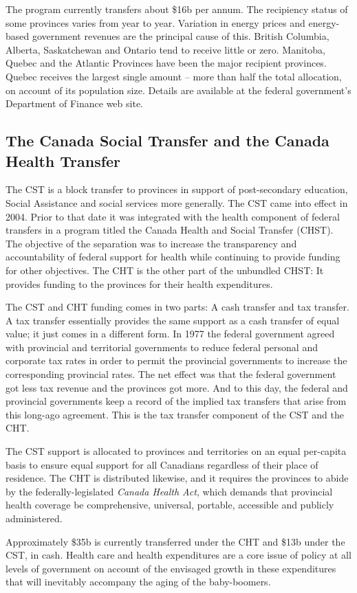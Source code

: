 The program currently transfers about \$16b per annum. The recipiency status
of some provinces varies from year to year. Variation in energy prices and
energy-based government revenues are the principal cause of this. British
Columbia, Alberta, Saskatchewan and Ontario tend to receive little or zero.
Manitoba, Quebec and the Atlantic Provinces have been the major recipient
provinces. Quebec receives the largest single amount -- more than half the
total allocation, on account of its population size. Details are available
at the federal government's Department of Finance web site.

\newhtmlpage

\subsection*{The Canada Social Transfer and the Canada Health Transfer}

The CST is a block transfer to provinces in support of post-secondary
education, Social Assistance and social services more generally. The CST
came into effect in 2004. Prior to that date it was integrated with the
health component of federal transfers in a program titled the Canada Health
and Social Transfer (CHST). The objective of the separation was to increase
the transparency and accountability of federal support for health while
continuing to provide funding for other objectives. The CHT is the other
part of the unbundled CHST: It provides funding to the provinces for their
health expenditures.

The CST and CHT funding comes in two parts: A cash transfer and tax
transfer. A tax transfer essentially provides the same support as a cash
transfer of equal value; it just comes in a different form. In 1977 the
federal government agreed with provincial and territorial governments to
reduce federal personal and corporate tax rates in order to permit the
provincial governments to increase the corresponding provincial rates. The
net effect was that the federal government got less tax revenue and the
provinces got more. And to this day, the federal and provincial governments
keep a record of the implied tax transfers that arise from this long-ago
agreement. This is the tax transfer component of the CST and the CHT.

The CST support is allocated to provinces and territories on an equal
per-capita basis to ensure equal support for all Canadians regardless of
their place of residence. The CHT is distributed likewise, and it requires
the provinces to abide by the federally-legislated \textit{Canada Health Act}, 
which demands that provincial health coverage be comprehensive, universal,
portable, accessible and publicly administered.

Approximately \$35b is currently transferred under the CHT and \$13b under
the CST, in cash. Health care and health expenditures are a core issue of
policy at all levels of government on account of the envisaged growth in
these expenditures that will inevitably accompany the aging of the
baby-boomers.